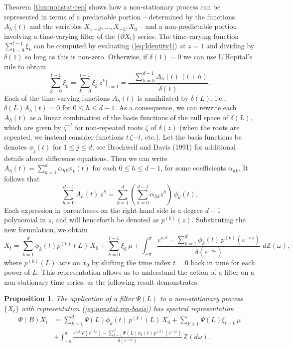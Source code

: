 \documentclass[a4paper]{book}
\def\ZZ{\mathbb Z}
\newtheorem{Proposition}{Proposition}
\begin{document}
  
  Theorem  \ref{thm:nonstat-rep} shows how a non-stationary process
  can be represented in  terms of a predictable
  portion -- determined by the functions $A_{h} (t)$ and the
  variables $X_{1-d}, \ldots, X_{-1}, X_0$ -- and a
  non-predictable portion involving a time-varying filter of the $\{
  \partial X_t \}$ series. 
  The time-varying function $\sum_{k=0}^{t-1} \xi_k $ can be computed
  by evaluating (\ref{eq:Identity1}) at $z=1$ and dividing by $\delta (1)$
   so long as this is non-zero.  Otherwise, if $\delta (1) = 0$ we can
   use L'Hopital's rule to obtain
  \[
   \sum_{k=0}^{t-1} \xi_k = \sum_{k=0}^{t-1} \xi_k \, z^k \vert_{z = 1}
   = \frac{ - \sum_{h=0}^{d-1} A_h (t) \, (t+h) }{ \dot{\delta} (1)}.
  \]
     Each of the time-varying functions $A_h (t)$ is annihilated
 by $\delta (L)$, i.e., $\delta (L) A_{h} (t) = 0$ for $0 \leq
 h \leq d-1$.   As a consequence, we can rewrite each $A_{h} (t)$ as a linear
 combination of the basis functions of the null space of $\delta
 (L)$, which are given by $\zeta^{-t}$ for non-repeated roots $\zeta$
  of $\delta (z)$ (when the roots are repeated, we instead consider
  functions $t \, \zeta{-t}$, etc.).  
    Let the basis  functions be denotes 
    $\phi_j (t) $ for $1 \leq j \leq d$; see Brockwell and Davis (1991)
     for additional details about difference equations.  Then we can
 write $A_{h} (t) = \sum_{k=1}^d \alpha_{hk} \phi_k (t)$ for each $0 \leq
 h \leq d-1$, for some coefficients $\alpha_{hk}$.  It follows that
\[
 \sum_{h=0}^{d-1} A_{h}(t) \, z^h = \sum_{k=1}^d \left(
 \sum_{h=0}^{d-1} \alpha_{hk} z^h \right)  \, \phi_k (t).
\]
 Each expression in parentheses on the right hand side is a degree
 $d-1$ polynomial in $z$, and will henceforth be denoted as $p^{(k)}
 (z)$.   Substituting the new formulation, we obtain
\begin{equation}
\label{eq:nonstat.rep-basis}
 X_t = \sum_{k=1}^d \phi_k (t) p^{(k)} (L) \, X_{0} + 
  \sum_{k=0}^{t-1} \xi_k \, \mu  +  \int_{-\pi}^{\pi}
 \frac{ e^{i \omega t} - \sum_{k=1}^d \phi_k (t) \, p^{(k)} ( e^{-i \omega
 } )}{ \delta (e^{-i \omega}) } \; d \ZZ (\omega),
\end{equation}
 where $p^{(k)} (L)$ acts on $x_0$ by shifting the time index $t=0$
 back in time for each power of $L$.  
  This representation allows us to 
  understand the action of a filter on a non-stationary time series,
  as the following result demonstrates.
  
\begin{Proposition}
  \label{prop:filter-nonstat}
  The application of a filter $\Psi (L)$ to a non-stationary process $\{ X_t \}$
  with representation  (\ref{eq:nonstat.rep-basis}) has spectral representation
 \begin{align*}
 \Psi (B) X_t & =   \sum_{k=1}^d \Psi (L) \phi_k (t) \, p^{(k)} (L) \, X_{0}  +
   \sum_{k \geq 1}  \Psi (L)  \xi_{t-k} \, \mu \\
   & +   \int_{-\pi}^{\pi}
   \frac{ e^{i \omega t} \, \Psi (e^{-i \omega}) 
   - \sum_{k=1}^d \Psi (L) \phi_k (t) \, p^{(k)} (e^{-i \omega}) 
    }{ \delta (e^{-i \omega}) } \, \ZZ (d\omega).
 \end{align*}
 \end{Proposition}
  
\end{document}
